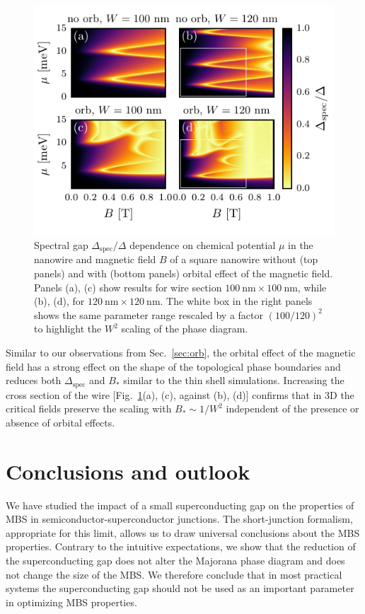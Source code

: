 \begin{figure}
\begin{center}
\includegraphics[width=0.7\columnwidth]{chapter_shortjunction/figures/phase_diagrams_3d}
\caption{Spectral gap $\Delta_\mathrm{spec}/\Delta$ dependence on chemical potential $\mu$ in the nanowire and magnetic field $B$ of a square nanowire without (top panels) and with (bottom panels) orbital effect of the magnetic field.
Panels (a), (c) show results for wire section $\SI{100}{\nm} \times \SI{100}{\nm}$, while (b), (d), for $\SI{120}{\nm} \times \SI{120}{\nm}$.
The white box in the right panels shows the same parameter range rescaled by a factor $\left(100/120\right)^2$ to highlight the $W^2$ scaling of the phase diagram.}
\label{fig:phase_diagrams_3d}
\end{center}
\end{figure}

Similar to our observations from Sec.~\ref{sec:orb}, the orbital effect of the magnetic field has a strong effect on the shape of the topological phase boundaries and reduces both $\Delta_\textrm{spec}$ and $B_*$ similar to the thin shell simulations.
Increasing the cross section of the wire [Fig.~\ref{fig:phase_diagrams_3d}(a), (c), against (b), (d)] confirms that in 3D the critical fields preserve the scaling with $B_*\sim 1/W^2$ independent of the presence or absence of orbital effects.

\section{Conclusions and outlook}
\label{sec:conc}

We have studied the impact of a small superconducting gap on the properties of MBS in semiconductor-superconductor junctions.
The short-junction formalism, appropriate for this limit, allows us to draw universal conclusions about the MBS properties.
Contrary to the intuitive expectations, we show that the reduction of the superconducting gap does not alter the Majorana phase diagram and does not change the size of the MBS.
We therefore conclude that in most practical systems the superconducting gap should not be used as an important parameter in optimizing MBS properties.

